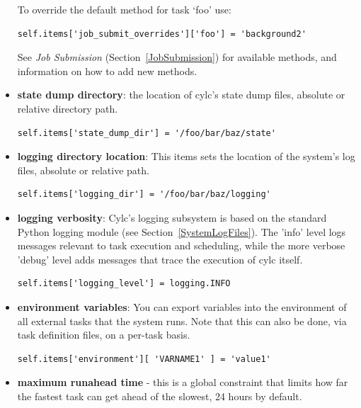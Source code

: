 \documentclass[11pt,a4paper]{article}
\begin{document}
\begin{itemize}
        To override the default method for task `foo' use:

        \begin{lstlisting}
self.items['job_submit_overrides']['foo'] = 'background2'
        \end{lstlisting}

        See {\em Job Submission} (Section~\ref{JobSubmission}) for
        available methods, and information on how to add new methods.


    \item {\bf state dump directory}: the location of cylc's state
        dump files, absolute or relative directory path.
        
        \begin{lstlisting}
self.items['state_dump_dir'] = '/foo/bar/baz/state'
        \end{lstlisting}


    \item {\bf logging directory location}: 
        This items sets the location of the system's log files, absolute
        or relative path.

        \begin{lstlisting}
self.items['logging_dir'] = '/foo/bar/baz/logging'
        \end{lstlisting}

    \item {\bf logging verbosity}: Cylc's logging subsystem is based on
        the standard Python logging module (see
        Section~\ref{SystemLogFiles}). The 'info' level logs messages
        relevant to task execution and scheduling, while the more
        verbose 'debug' level adds messages that trace the execution of
        cylc itself.

        \begin{lstlisting}
self.items['logging_level'] = logging.INFO
        \end{lstlisting}

    \item {\bf environment variables}: You can export variables into the 
        environment of all external tasks that the system runs. Note that
        this can also be done, via task definition files, on a per-task
        basis.

        \begin{lstlisting}
self.items['environment'][ 'VARNAME1' ] = 'value1'
        \end{lstlisting}

    \item {\bf maximum runahead time} - this is a global constraint that
        limits how far the fastest task can get ahead of the slowest, 24
        hours by default.
        

\end{itemize}
\end{document}
